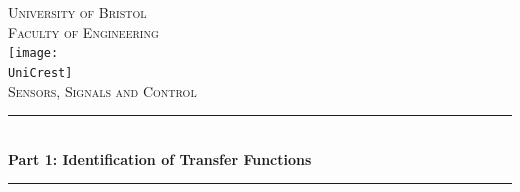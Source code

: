 \documentclass[11pt]{article}
\newcommand{\AssignmentTitle}{Part 1: Identification of Transfer Functions}
\newcommand{\ModuleTitle}{Sensors, Signals and Control}
\newcommand{\University}{University of Bristol}
\newcommand{\Faculty}{Faculty of Engineering}
\newcommand{\UniCrest}{crestbris.png}
\newcommand{\horrule}[1]{\rule{\linewidth}{#1}}
\begin{document}
  \setlength{\abovedisplayskip}{-14pt}
  \setlength{\belowdisplayskip}{2pt}
  \setlength{\abovedisplayshortskip}{-14pt}
  \setlength{\belowdisplayshortskip}{2pt}



\begin{titlepage}

	\center %
		\normalfont \normalsize \textsc{\University} \\ [10pt]
		\normalfont \normalsize \textsc{\Faculty} \\ [25pt]
		\texttt{[image: \\UniCrest]}\\[0.5cm]
		\normalfont \normalsize \textsc{\ModuleTitle} \\ [25pt]
		\horrule{0.5pt} \\[0.4cm]
		\huge \textbf{\AssignmentTitle} \\
		\horrule{2pt} \\[0.5cm]

\end{titlepage}
\end{document}
